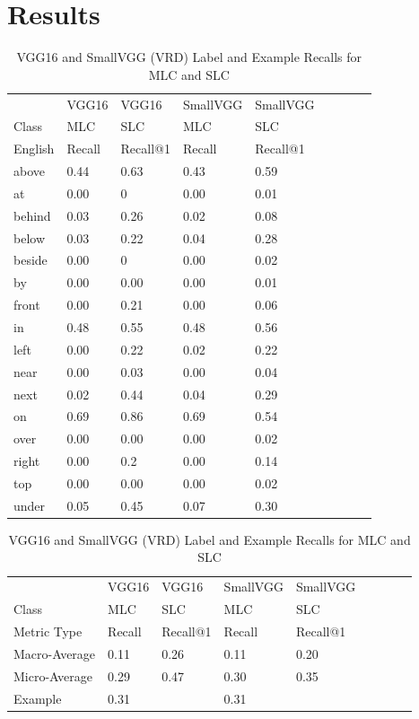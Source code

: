 \documentclass{IEEEtran}
\begin{document}
\section{Results}
\small 
\begin{table}[!htbp]
\caption{VRD Convolutional Neural Network Evaluation Results}
\centering
\begin{tabular}{|l|l|l|l|l|llll}
\cline{1-5}
        &  VGG16 & VGG16 & SmallVGG & SmallVGG \\ \cline{1-5}
Class   &  MLC   &  SLC    & MLC  & SLC  \\ \cline{1-5}
English &  Recall & Recall@1  & Recall  & Recall@1  \\ \cline{1-5}
above	&	0.44  &	0.63	  &	0.43    &	0.59  \\ \cline{1-5}
at	    &	0.00  &	0	      &	0.00    &	0.01  \\ \cline{1-5}
behind	&	0.03  &	0.26	  &	0.02    &	0.08  \\ \cline{1-5}
below	&	0.03  &	0.22      &	0.04    &	0.28  \\ \cline{1-5}
beside	&	0.00  &	0	      &	0.00    &	0.02  \\ \cline{1-5}
by	    &	0.00  &	0.00      &	0.00    &	0.01  \\ \cline{1-5}
front	&	0.00  &	0.21	  &	0.00    &	0.06  \\ \cline{1-5}
in	    &	0.48  &	0.55      &	0.48    &	0.56  \\ \cline{1-5}
left	&	0.00  &	0.22      &	0.02    &	0.22  \\ \cline{1-5}
near	&	0.00  &	0.03	  &	0.00    &	0.04  \\ \cline{1-5}
next	&	0.02  &	0.44	  &	0.04    &	0.29  \\ \cline{1-5}
on	    &	0.69  &	0.86	  &	0.69    &	0.54  \\ \cline{1-5}
over	&	0.00  &	0.00	  &	0.00    &	0.02  \\ \cline{1-5}
right	&	0.00  &	0.2	      &	0.00    &	0.14  \\ \cline{1-5}
top	    &	0.00  &	0.00	  &	0.00    &	0.02  \\ \cline{1-5}
under	&	0.05  &	0.45	  &	0.07    &	0.30  \\ \cline{1-5}
\end{tabular}
\caption{VGG16 and SmallVGG (VRD) Recalls for MLC and SLC}
\centering
\begin{tabular}{|l|l|l|l|l|llll}
\cline{1-5}
               &  VGG16 & VGG16 & SmallVGG & SmallVGG \\ \cline{1-5}
Class          &  MLC       &  SLC     &  MLC  &  SLC  		\\ \cline{1-5}
Metric Type    &  Recall  & Recall@1  &  Recall  & Recall@1 \\ \cline{1-5}
Macro-Average  &	0.11  &	0.26	  &	0.11     &	0.20	\\ \cline{1-5}
Micro-Average  &	0.29  &	0.47      &	0.30     &	0.35	\\ \cline{1-5}
Example        &	0.31  &           &	0.31     &          \\ \cline{1-5}
\end{tabular}
\caption{VGG16 and SmallVGG (VRD) Label and Example Recalls for MLC and SLC}
\end{table}
\end{document}

